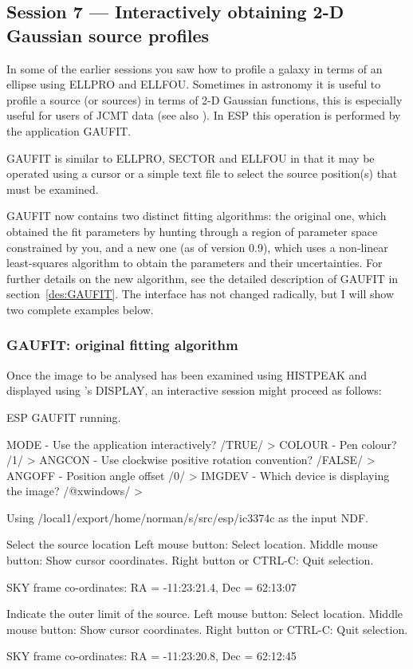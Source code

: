 \documentclass[twoside,11pt]{starlink}
\begin{document}
\subsection{Session 7 --- Interactively obtaining 2-D Gaussian source profiles}
In some of the earlier sessions you saw how to profile a galaxy in
terms of an ellipse using ELLPRO and ELLFOU. Sometimes in astronomy
it is useful to profile a source (or sources) in terms of 2-D Gaussian
functions, this is especially useful for users of JCMT data (see also
). In ESP this operation is performed by the
application GAUFIT.

GAUFIT is similar to ELLPRO, SECTOR and ELLFOU in that it may be operated
using a cursor or a simple text file to select the source position(s) that
must be examined.

GAUFIT now contains two distinct fitting algorithms: the original one,
which obtained the fit parameters by hunting through a region of
parameter space constrained by you, and a new one (as of version 0.9),
which uses a non-linear least-squares algorithm to obtain the
parameters and their uncertainties.  For further details on the new
algorithm, see the detailed description of GAUFIT in
section~\ref{des:GAUFIT}.  The interface has not changed radically,
but I will show two complete examples below.







\subsubsection{GAUFIT: original fitting algorithm}

Once the image to be analysed has been examined using
HISTPEAK and displayed using 's DISPLAY, an interactive
session might proceed as follows:

\begin{terminalv}

ESP GAUFIT running.

MODE - Use the application interactively? /TRUE/ >
COLOUR - Pen colour? /1/ >
ANGCON - Use clockwise positive rotation convention? /FALSE/ >
ANGOFF - Position angle offset /0/ >
IMGDEV - Which device is displaying the image? /@xwindows/ >

Using /local1/export/home/norman/s/src/esp/ic3374c as the input NDF.

Select the source location
Left mouse button:        Select location.
Middle mouse button:      Show cursor coordinates.
Right button or CTRL-C:  Quit selection.

  SKY frame co-ordinates:  RA = -11:23:21.4,  Dec = 62:13:07

Indicate the outer limit of the source.
Left mouse button:        Select location.
Middle mouse button:      Show cursor coordinates.
Right button or CTRL-C:  Quit selection.

  SKY frame co-ordinates:  RA = -11:23:20.8,  Dec = 62:12:45
\end{terminalv}
\end{document}
